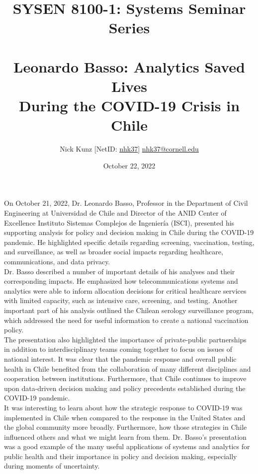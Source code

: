 \documentclass[11pt]{article}
\begin{document}
\title{SYSEN 8100-1: Systems Seminar Series\\~\\
    \Large Leonardo Basso: Analytics Saved Lives \\During the COVID-19 Crisis in Chile
}
\author{
    Nick Kunz [NetID: \url{nhk37}] \hyperlink{nhk37@cornell.edu}{nhk37@cornell.edu}
}
\date{October 22, 2022}
\maketitle

On October 21, 2022, Dr. Leonardo Basso, Professor in the Department of Civil Engineering at Universidad de Chile and Director of the ANID Center of Excellence Instituto Sistemas Complejos de Ingeniería (ISCI), presented his supporting analysis for policy and decision making in Chile during the COVID-19 pandemic. He highlighted specific details regarding screening, vaccination, testing, and surveillance, as well as broader social impacts regarding healthcare, communications, and data privacy. \\

Dr. Basso described a number of important details of his analyses and their corresponding impacts. He emphasized how telecommunications systems and analytics were able to inform allocation decisions for critical healthcare services with limited capacity, such as intensive care, screening, and testing. Another important part of his analysis outlined the Chilean serology surveillance program, which addressed the need for useful information to create a national vaccination policy. \\

The presentation also highlighted the importance of private-public partnerships in addition to interdisciplinary teams coming together to focus on issues of national interest. It was clear that the pandemic response and overall public health in Chile benefited from the collaboration of many different disciplines and cooperation between institutions. Furthermore, that Chile continues to improve upon data-driven decision making and policy precedents established during the COVID-19 pandemic.\\

It was interesting to learn about how the strategic response to COVID-19 was implemented in Chile when compared to the response in the United States and the global community more broadly. Furthermore, how those strategies in Chile influenced others and what we might learn from them. Dr. Basso's presentation was a good example of the many useful applications of systems and analytics for public health and their importance in policy and decision making, especially during moments of uncertainty.
\end{document}
